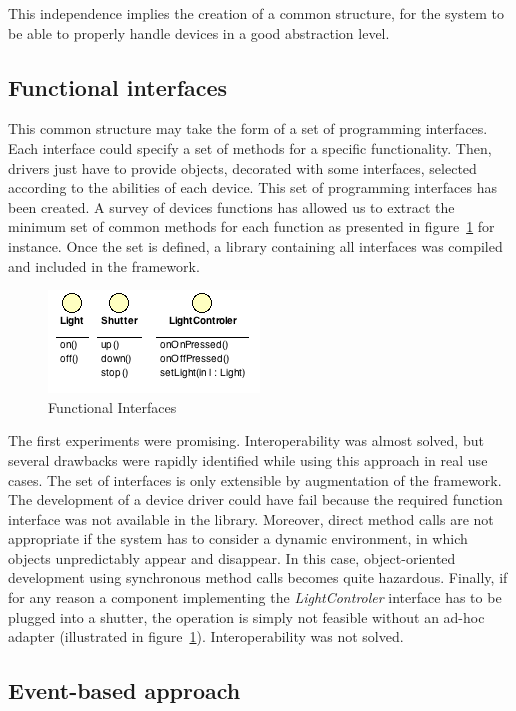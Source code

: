 This independence implies the creation of a common structure, for the system to be able to properly handle devices in a good abstraction level.

\subsection{Functional interfaces}

This common structure may take the form of a set of programming interfaces. Each interface could specify a set of methods for a specific functionality. Then, drivers just have to provide objects, decorated with some interfaces, selected according to the abilities of each device. This set of programming interfaces has been created. A survey of devices functions has allowed us to extract the minimum set of common methods for each function as presented in figure~\ref{fig:interfaces} for instance. Once the set is defined, a library containing all interfaces was compiled and included in the framework.\\
\begin{figure}[h!]
\centering
\includegraphics{part2/pics/FunctionalInterfaces.png}
\caption{Functional Interfaces}
\label{fig:interfaces}
\end{figure}
The first experiments were promising. Interoperability was almost solved, but several drawbacks were rapidly identified while using this approach in real use cases. The set of interfaces is only extensible by augmentation of the framework. The development of a device driver could have fail because the required function interface was not available in the library. Moreover, direct method calls are not appropriate if the system has to consider a dynamic environment, in which objects unpredictably appear and disappear. In this case, object-oriented development using synchronous method calls becomes quite hazardous. Finally, if for any reason a component implementing the {\it LightControler} interface has to be plugged into a shutter, the operation is simply not feasible without an ad-hoc adapter (illustrated in figure~\ref{fig:interfaces}). Interoperability was not solved.\\


\subsection{Event-based approach}

